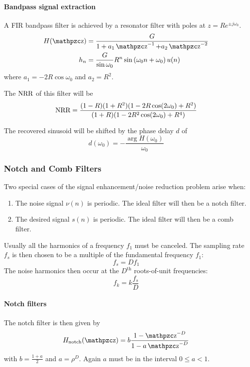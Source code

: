 \paragraph{Bandpass signal extraction}
A FIR bandpass filter is achieved by a resonator filter with poles at $z = R e^{\pm j \omega_0}$.
\begin{align*}
	H(\z) &= \frac{G}{1 + a_1 \z^{-1} + a_2 \z^{-2}} \\ 
	h_n &= \frac{G}{\sin \omega_0} R^n \sin\left(\omega_0 n + \omega_0\right) u(n)
\end{align*}
where $a_1 = -2R \cos\omega_0$ and $a_2 = R^2$.

The $\operatorname{\text{NRR}}$ of this filter will be
\begin{equation*}
	\operatorname{\text{NRR}}= \frac{(1-R)(1+R^2)(1-2R\cos(2\omega_0)+R^2)}{(1+R)(1-2R^2\cos(2\omega_0)+R^4)}
\end{equation*}

The recovered sinusoid will be shifted by the phase delay $d$ of
\begin{equation*}
	d(\omega_0) = - \frac{\arg H(\omega_0)}{\omega_0}
\end{equation*}

\newpage
\subsubsection{Notch and Comb Filters}

Two special cases of the signal enhancement/noise reduction problem arise when:
\begin{enumerate}
	\item The noise signal $\nu(n)$ is periodic. The ideal filter will then 
	be a notch filter.
	\item The desired signal $s(n)$ is periodic. The ideal filter will then
	be a comb filter.
\end{enumerate} 

Usually all the harmonics of a frequency $f_1$ must be canceled.
The sampling rate $f_s$ is then chosen to be a multiple of the fundamental
frequency $f_1$: 
\begin{equation*}
	f_s = D f_1
\end{equation*}
The noise harmonics then occur at the $D^{\text{th}}$ roots-of-unit frequencies:
\begin{equation*}
	f_k = k \frac{f_s}{D}
\end{equation*}

\paragraph{Notch filters}The notch filter is then given by
\begin{equation*}
	H_{\text{notch}}(\z) = b \frac{1-\z^{-D}}{1-a\z^{-D}}
\end{equation*}
with $b = \frac{1+a}{2}$ and $a = \rho^D$. Again $a$ must be in the interval
$0 \leq a < 1$. \\

